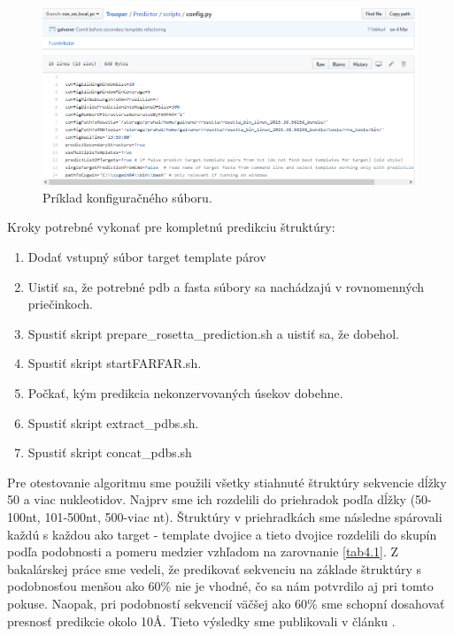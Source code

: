 \begin{figure}%
\includegraphics[width=\textwidth]{../img/config}
\caption{Príklad konfiguračného súboru.}
\label{obr04:config}
\end{figure}


\indent Kroky potrebné vykonať pre kompletnú predikciu štruktúry:
\begin{enumerate}
\item Dodať vstupný súbor target template párov
\item Uistiť sa, že potrebné pdb a fasta súbory sa nachádzajú v rovnomenných priečinkoch.
\item Spustiť skript prepare\_rosetta\_prediction.sh a uistiť sa, že dobehol.
\item Spustiť skript startFARFAR.sh.
\item Počkať, kým predikcia nekonzervovaných úsekov dobehne.
\item Spustiť skript extract\_pdbs.sh.
\item Spustiť skript concat\_pdbs.sh
\end{enumerate}

\indent Pre otestovanie algoritmu sme použili všetky stiahnuté štruktúry sekvencie dĺžky 50 a viac nukleotidov. Najprv sme ich rozdelili do priehradok podľa dĺžky (50-100nt, 101-500nt, 500-viac nt). Štruktúry v priehradkách sme následne spárovali každú s každou ako target - template dvojice a tieto dvojice rozdelili do skupín podľa podobnosti a pomeru medzier vzhľadom na zarovnanie \ref{tab4.1}. Z bakalárskej práce sme vedeli, že predikovať sekvenciu na základe štruktúry s podobnosťou menšou ako 60\% nie je vhodné, čo sa nám potvrdilo aj pri tomto pokuse. Naopak, pri podobností sekvencií väčšej ako 60\% sme schopní dosahovať presnosť predikcie okolo 10Å. Tieto výsledky sme publikovali v článku \cite{7822808}. 

